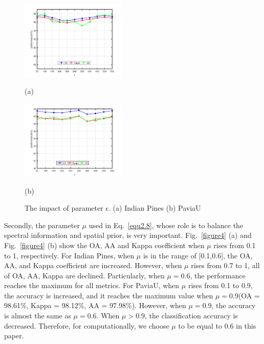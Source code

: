 \documentclass{ws-ijwmip}
\begin{document}
      \begin{figure}[bh]
        \centering
        \begin{minipage}[b]{0.45\linewidth}
            \centering
            \centerline{
            \includegraphics[width=5cm ]{image/indianPines_emsou}}
            \centerline{(a)}
            \medskip
        \end{minipage}
        \begin{minipage}[b]{0.45\linewidth}
            \centering
            \centerline{
            \includegraphics[width=5cm ]{image/paviaU_emsou}}
            \centerline{(b)}
            \medskip
        \end{minipage}
        \caption{The impact of parameter $\epsilon$. (a) Indian Pines  (b) PaviaU}
        \label{figure5}
    \end{figure}

Secondly, the parameter $\mu$ used in Eq.~\ref{equ2.8}, whose role is to balance the spectral information and spatial prior, is very important. 
Fig.~\ref{figure4} (a) and Fig.~\ref{figure4} (b) show the OA, AA and Kappa coefficient when $\mu$ rises from 0.1 to 1, respectively. 
For Indian Pines, when $\mu$ is in the range of [0.1,0.6], the OA, AA, and Kappa coefficient are increased. However, when $\mu$ rises from 0.7 to 1, all of OA, AA, Kappa are declined. Particularly, when $\mu = 0.6$, the performance reaches the maximum for all metrics. 
For PaviaU, when $\mu$ rises from 0.1 to 0.9, the accuracy is increased, and it reaches the maximum value when $\mu=0.9$(OA = 98.61\%, Kappa = 98.12\%, AA = 97.98\%). However, when $\mu = 0.9$, the accuracy is almost the same as $\mu = 0.6$. When $\mu>0.9$, the classification accuracy is decreased. Therefore, for computationally, we choose $\mu$ to be equal to 0.6 in this paper.
\end{document}

